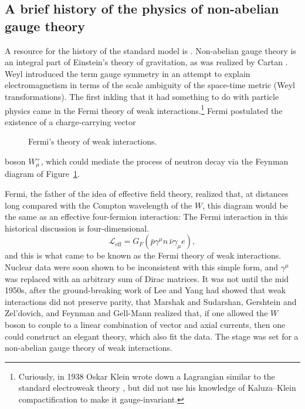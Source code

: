 \subsection{A brief history of the physics of non-abelian gauge theory}

A resource for the history of the standard model is \cite{banks-ref-55}. Non-abelian gauge
theory is an integral part of Einstein's theory of gravitation, as was realized
by Cartan \cite{banks-ref-56}. Weyl \cite{banks-ref-57} introduced the term gauge symmetry in an attempt to
explain electromagnetism in terms of the scale ambiguity of the space-time
metric (Weyl transformations). The first inkling that it had something to do
with particle physics came in the Fermi theory of weak interactions.\footnote[4]{Curiously,
in 1938 Oskar Klein wrote down a Lagrangian similar to the standard electroweak
theory \cite{banks-ref-58,banks-ref-59}, but did not use his knowledge of Kaluza--Klein compactification
to make it gauge-invariant.} Fermi postulated the existence of a charge-carrying
vector

\begin{figure}[htbp]
  \centering
  
  \caption{Fermi's theory of weak interactions.}
  \label{fig:8.1}
\end{figure}

boson $W_\mu^+$, which could mediate the process of neutron decay via the
Feynman diagram of Figure~\ref{fig:8.1}.

Fermi, the father of the idea of effective field theory, realized that, at
distances long compared with the Compton wavelength of the $W$, this diagram
would be the same as an effective four-fermion interaction:
The Fermi interaction in this historical discussion is four-dimensional.
\begin{equation*}
  \mathcal L_{\mathrm{eff}}=G_F(\bar p\gamma^\mu n\,\bar\nu\gamma_\mu e),
\end{equation*}
and this is what came to be known as the Fermi theory of weak interactions.
Nuclear data were soon shown to be inconsistent with this simple form, and
$\gamma^\mu$ was replaced with an arbitrary sum of Dirac matrices. It was not
until the mid 1950s, after the ground-breaking work of Lee and Yang \cite{banks-ref-60} had
showed that weak interactions did not preserve parity, that Marshak and
Sudarshan, Gershtein and Zel'dovich, and Feynman and Gell-Mann \cite{banks-ref-61,banks-ref-62,banks-ref-63}
realized that, if one allowed the $W$ boson to couple to a linear combination
of vector and axial currents, then one could construct an elegant theory, which
also fit the data. The stage was set for a non-abelian gauge theory of weak
interactions.

